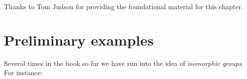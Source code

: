 
Thanks to Tom Judson for providing the foundational material for this chapter.

\section{Preliminary examples}
\label{sec:Isomorphism:Introduction}

Several times in the book so far we have run into the idea of  \emph{isomorphic groups}.  For instance:

